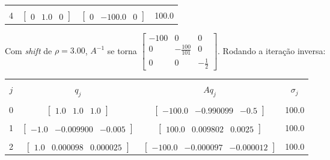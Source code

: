 \documentclass[a4paper,11pt]{article}
\begin{document}
\begin{enumerate}[label=\textbf{(\alph*)}]
\begin{center}
\begin{tabular}{ | c | c | c | c | }
                    \hline
                    & & & \\ [-1em]
                    4  & $\begin{bmatrix} 0 & 1.0 & 0 \end{bmatrix}$ & $\begin{bmatrix} 0 & -100.0 & 0 \end{bmatrix}$  & 100.0 \\ [+.5em]
                    \hline
                \end{tabular}
            \end{center}
            Com \textit{shift} de $\rho=3.00$, $A^{-1}$ se torna $\begin{bmatrix}
                        -100 & 0 & 0 \\
                        0 & -\frac{100}{101} & 0\\
                        0 & 0 & -\frac{1}{2}
                    \end{bmatrix}$. Rodando a iteração inversa:
            \begin{center}
                \begin{tabular}{ | c | c | c | c | } 
                    \hline
                    & & & \\ [-1em]
                    $j$ & $q_j$ & $Aq_j$ & $\sigma_j$\\  [+.5em]
                    \hline\hline
                    & & & \\ [-1em]
                    0  & $\begin{bmatrix} 1.0 & 1.0 & 1.0 \end{bmatrix}$ & $\begin{bmatrix} -100.0 & -0.990099 & -0.5 \end{bmatrix}$  & 100.0 \\ [+.5em]
                    \hline
                    & & & \\ [-1em]
                    1  & $\begin{bmatrix} -1.0 & -0.009900 & -0.005 \end{bmatrix}$ & $\begin{bmatrix} 100.0 & 0.009802 & 0.0025 \end{bmatrix}$  & 100.0 \\ [+.5em]
                    \hline
                    & & & \\ [-1em]
                    2  & $\begin{bmatrix} 1.0 & 0.000098 & 0.000025 \end{bmatrix}$ & $\begin{bmatrix} -100.0 & -0.000097 & -0.000012 \end{bmatrix}$  & 100.0 \\ [+.5em]

\end{tabular}
\end{center}
\end{enumerate}
\end{document}
